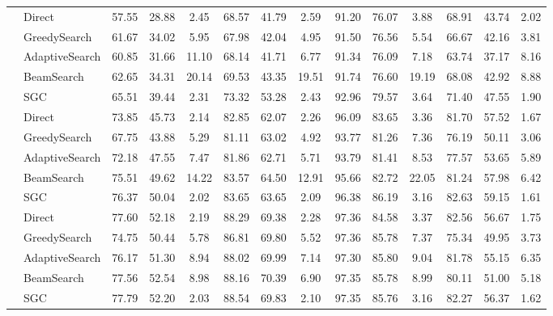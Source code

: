 \documentclass[11pt,UTF8,fontset=fandol]{ctexart}
\begin{document}
\begin{table}[H]
\begin{tabular}{llccc ccc ccc ccc}
\midrule
{}
& Direct & 57.55 & 28.88 & 2.45 & 68.57 & 41.79 & 2.59 & 91.20 & 76.07 & 3.88 & 68.91 & 43.74 & 2.02\\
& GreedySearch & 61.67 & 34.02 & 5.95 & 67.98 & 42.04 & 4.95 & 91.50 & 76.56 & 5.54 & 66.67 & 42.16 & 3.81\\
& AdaptiveSearch & 60.85 & 31.66 & 11.10 & 68.14 & 41.71 & 6.77 & 91.34 & 76.09 & 7.18 & 63.74 & 37.17 & 8.16\\
& BeamSearch & 62.65 & 34.31 & 20.14 & 69.53 & 43.35 & 19.51 & 91.74 & 76.60 & 19.19 & 68.08 & 42.92 & 8.88\\
& SGC & 65.51 & 39.44 & 2.31 & 73.32 & 53.28 & 2.43 & 92.96 & 79.57 & 3.64 & 71.40 & 47.55 & 1.90\\
\midrule
{}
& Direct & 73.85 & 45.73 & 2.14 & 82.85 & 62.07 & 2.26 & 96.09 & 83.65 & 3.36 & 81.70 & 57.52 & 1.67\\
& GreedySearch & 67.75 & 43.88 & 5.29 & 81.11 & 63.02 & 4.92 & 93.77 & 81.26 & 7.36 & 76.19 & 50.11 & 3.06\\
& AdaptiveSearch & 72.18 & 47.55 & 7.47 & 81.86 & 62.71 & 5.71 & 93.79 & 81.41 & 8.53 & 77.57 & 53.65 & 5.89\\
& BeamSearch & 75.51 & 49.62 & 14.22 & 83.57 & 64.50 & 12.91 & 95.66 & 82.72 & 22.05 & 81.24 & 57.98 & 6.42\\
& SGC & 76.37 & 50.04 & 2.02 & 83.65 & 63.65 & 2.09 & 96.38 & 86.19 & 3.16 & 82.63 & 59.15 & 1.61\\
\midrule
{}
& Direct & 77.60 & 52.18 & 2.19 & 88.29 & 69.38 & 2.28 & 97.36 & 84.58 & 3.37 & 82.56 & 56.67 & 1.75\\
& GreedySearch & 74.75 & 50.44 & 5.78 & 86.81 & 69.80 & 5.52 & 97.36 & 85.78 & 7.37 & 75.34 & 49.95 & 3.73\\
& AdaptiveSearch & 76.17 & 51.30 & 8.94 & 88.02 & 69.99 & 7.14 & 97.30 & 85.80 & 9.04 & 81.78 & 55.15 & 6.35\\
& BeamSearch & 77.56 & 52.54 & 8.98 & 88.16 & 70.39 & 6.90 & 97.35 & 85.78 & 8.99 & 80.11 & 51.00 & 5.18\\
& SGC & 77.79 & 52.20 & 2.03 & 88.54 & 69.83 & 2.10 & 97.35 & 85.76 & 3.16 & 82.27 & 56.37 & 1.62\\
\bottomrule
\end{tabular}
\end{table}
\end{document}
